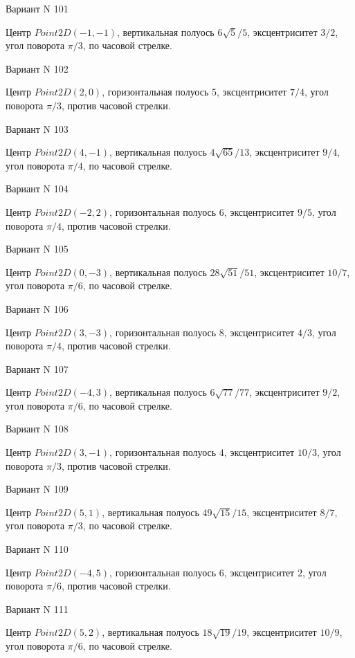 \documentclass[11pt]{report}
\begin{document}
Вариант N 101

Центр $Point2D\left(-1, -1\right)$, вертикальная полуось $6 \sqrt{5} / 5$, эксцентриситет $3 / 2$, угол поворота $\pi / 3$, по часовой стрелке.

Вариант N 102

Центр $Point2D\left(2, 0\right)$, горизонтальная полуось $5$, эксцентриситет $7 / 4$, угол поворота $\pi / 3$, против часовой стрелки.

Вариант N 103

Центр $Point2D\left(4, -1\right)$, вертикальная полуось $4 \sqrt{65} / 13$, эксцентриситет $9 / 4$, угол поворота $\pi / 4$, по часовой стрелке.

Вариант N 104

Центр $Point2D\left(-2, 2\right)$, горизонтальная полуось $6$, эксцентриситет $9 / 5$, угол поворота $\pi / 4$, против часовой стрелки.

Вариант N 105

Центр $Point2D\left(0, -3\right)$, вертикальная полуось $28 \sqrt{51} / 51$, эксцентриситет $10 / 7$, угол поворота $\pi / 6$, по часовой стрелке.

Вариант N 106

Центр $Point2D\left(3, -3\right)$, горизонтальная полуось $8$, эксцентриситет $4 / 3$, угол поворота $\pi / 4$, против часовой стрелки.

Вариант N 107

Центр $Point2D\left(-4, 3\right)$, вертикальная полуось $6 \sqrt{77} / 77$, эксцентриситет $9 / 2$, угол поворота $\pi / 6$, по часовой стрелке.

Вариант N 108

Центр $Point2D\left(3, -1\right)$, горизонтальная полуось $4$, эксцентриситет $10 / 3$, угол поворота $\pi / 3$, против часовой стрелки.

Вариант N 109

Центр $Point2D\left(5, 1\right)$, вертикальная полуось $49 \sqrt{15} / 15$, эксцентриситет $8 / 7$, угол поворота $\pi / 3$, по часовой стрелке.

Вариант N 110

Центр $Point2D\left(-4, 5\right)$, горизонтальная полуось $6$, эксцентриситет $2$, угол поворота $\pi / 6$, против часовой стрелки.

Вариант N 111

Центр $Point2D\left(5, 2\right)$, вертикальная полуось $18 \sqrt{19} / 19$, эксцентриситет $10 / 9$, угол поворота $\pi / 6$, по часовой стрелке.
\end{document}
